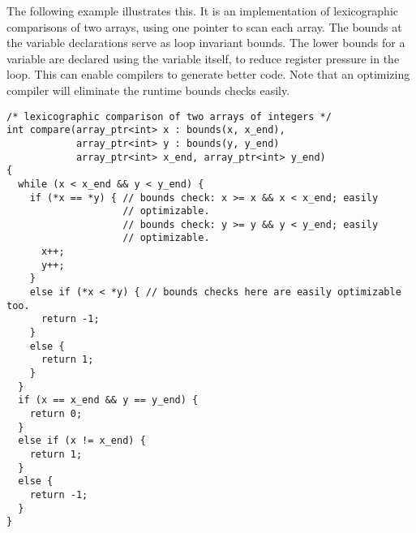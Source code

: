 The following example illustrates this. It is an implementation of
lexicographic comparisons of two arrays, using one pointer to scan each
array. The bounds at the variable declarations serve as loop invariant
bounds. The lower bounds for a variable are declared using the variable
itself, to reduce register pressure in the loop. This can enable
compilers to generate better code. Note that an optimizing compiler will
eliminate the runtime bounds checks easily.

\begin{lstlisting}
/* lexicographic comparison of two arrays of integers */
int compare(array_ptr<int> x : bounds(x, x_end), 
            array_ptr<int> y : bounds(y, y_end)
            array_ptr<int> x_end, array_ptr<int> y_end)
{ 
  while (x < x_end && y < y_end) {
    if (*x == *y) { // bounds check: x >= x && x < x_end; easily
                    // optimizable.
                    // bounds check: y >= y && y < y_end; easily
                    // optimizable.
      x++;
      y++;
    }
    else if (*x < *y) { // bounds checks here are easily optimizable too.
      return -1;
    }
    else {
      return 1;
    }
  }
  if (x == x_end && y == y_end) {
    return 0;
  }
  else if (x != x_end) {
    return 1;
  }
  else {
    return -1; 
  }
}
\end{lstlisting}

